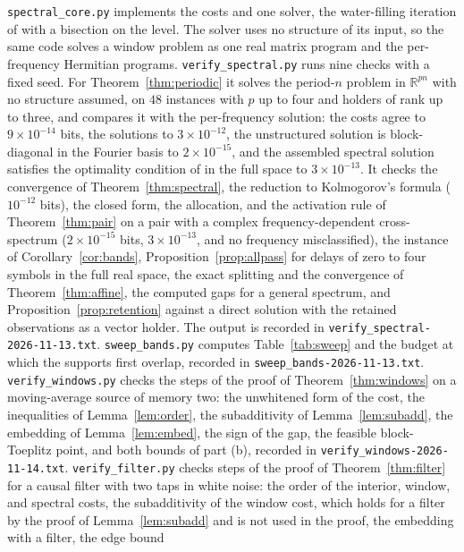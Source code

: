 \documentclass[11pt,onecolumn]{IEEEtran}
\newcommand{\R}{\mathbb{R}}
\begin{document}
\texttt{spectral\_core.py} implements the costs and one solver, the
water-filling iteration of \cite[Proposition~11]{part1} with a bisection
on the level. The solver uses no structure of its input, so the same
code solves a window problem as one real matrix program and the
per-frequency Hermitian programs. \texttt{verify\_spectral.py} runs nine
checks with a fixed seed. For Theorem~\ref{thm:periodic} it solves the
period-$n$ problem in $\R^{pn}$ with no structure assumed, on $48$
instances with $p$ up to four and holders of rank up to three, and
compares it with the per-frequency solution: the costs agree to
$9\times10^{-14}$ bits, the solutions to $3\times10^{-12}$, the
unstructured solution is block-diagonal in the Fourier basis to
$2\times10^{-15}$, and the assembled spectral solution satisfies the
optimality condition of \cite[Theorem~7]{part1} in the full space to
$3\times10^{-13}$. It checks the convergence of
Theorem~\ref{thm:spectral}, the reduction to Kolmogorov's formula
($10^{-12}$ bits), the closed form, the allocation, and the activation
rule of Theorem~\ref{thm:pair} on a pair with a complex
frequency-dependent cross-spectrum ($2\times10^{-15}$ bits, $3\times10^{-13}$,
and no frequency misclassified), the instance of
Corollary~\ref{cor:bands}, Proposition~\ref{prop:allpass} for delays of
zero to four symbols in the full real space, the exact splitting and
the convergence of Theorem~\ref{thm:affine}, the computed gaps for a
general spectrum, and Proposition~\ref{prop:retention}
against a direct solution with the retained observations as a vector
holder. The output is recorded in
\texttt{verify\_spectral-2026-11-13.txt}. \texttt{sweep\_bands.py}
computes Table~\ref{tab:sweep} and the budget at which the supports
first overlap, recorded in \texttt{sweep\_bands-2026-11-13.txt}.
\texttt{verify\_windows.py} checks the steps of the proof of
Theorem~\ref{thm:windows} on a moving-average source of memory two: the
unwhitened form of the cost, the inequalities of
Lemma~\ref{lem:order}, the subadditivity of Lemma~\ref{lem:subadd}, the
embedding of Lemma~\ref{lem:embed}, the sign of the gap, the feasible
block-Toeplitz point, and both bounds of part (b), recorded in
\texttt{verify\_windows-2026-11-14.txt}.
\texttt{verify\_filter.py} checks steps of the proof of
Theorem~\ref{thm:filter} for a causal filter with two taps in white
noise: the order of the interior, window, and spectral costs, the
subadditivity of the window cost, which holds for a filter by the proof
of Lemma~\ref{lem:subadd} and is not used in the proof, the embedding
with a filter, the edge bound
\end{document}
